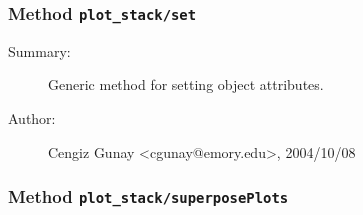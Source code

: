\subsubsection[Method \texttt{set}]{Method \texttt{plot\_stack/set}}%
%
\label{ref_plot_stack__set}%
\hypertarget{ref_plot_stack__set}{}%
\begin{description}
\item[Summary:]Generic method for setting object attributes.
%
%
%
%
%
%
%
\item[Author:]%
Cengiz Gunay <cgunay@emory.edu>, 2004/10/08
%
\end{description}
\methodline%
\subsubsection[Method \texttt{superposePlots}]{Method \texttt{plot\_stack/superposePlots}}%
%
\label{ref_plot_stack__superposePlots}%
\hypertarget{ref_plot_stack__superposePlots}{}%

